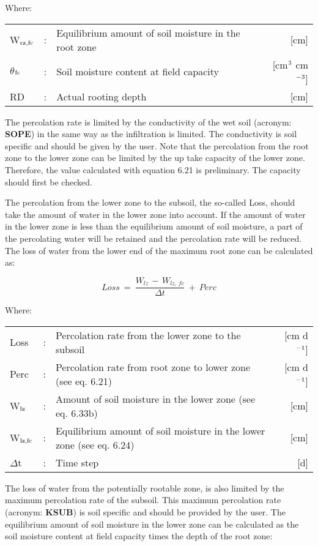 Where:\\[5pt]
\begin{tabularx}{\textwidth}{llXr}
W$_{{\rm rz,fc}}$ &:& Equilibrium amount of soil moisture in the root zone  & [cm]\\
$\theta$$_{{\rm fc}}$ &:& Soil moisture content at field capacity  & [cm$^{{\rm 3}}$ cm$^{{\rm -3}}$]\\
RD &:& Actual rooting depth  & [cm]\\
\end{tabularx}



The percolation rate is limited by the conduc\-tivity of the wet soil (acronym: {\bf SOPE}) in the
same way as the infiltration is limited. The conductivity is soil specific and should be
given by the user. Note that the percolation from the root zone to the lower zone can be
limited by the up take capacity of the lower zone. Therefore, the value calculated with 
equation 6.21 is preliminary. The capacity should first be checked.

The percolation from the lower zone to the subsoil, the so-called Loss, should take the
amount of water in the lower zone into account. If the amount of water in the lower zone
is less than the equilibrium amount of soil moisture, a part of the percolating water will
be retained and the percolation rate will be reduced. The loss of water from the lower end
of the maximum root zone can be calculated as:

\begin{equation}
Loss ~=~{\frac{W _{lz} \, -\, W _{lz,\, fc} }{\Delta t}} ~+~ Perc
\end{equation}

Where:\\[5pt]
\begin{tabularx}{\textwidth}{llXr}
Loss &:& Percolation rate from the lower zone to the subsoil   & [cm d$^{{\rm -1}}$]\\
Perc &:& Percolation rate from root zone to lower zone (see eq. 6.21)  & [cm d$^{{\rm -1}}$]\\
W$_{{\rm lz}}$ &:& Amount of soil moisture in the lower zone (see eq. 6.33b)  & [cm]\\
W$_{{\rm lz,fc}}$ &:& Equilibrium amount of soil moisture in the
   lower zone (see eq. 6.24)  & [cm]\\
$\Delta$t &:& Time step   & [d]\\
\end{tabularx}

The loss of water from the potentially rootable zone, is also limited by the maximum
percolation rate of the subsoil. This maximum percolation rate (acronym: {\bf KSUB}) is soil
specific and should be provided by the user. The equilibrium amount of soil moisture in
the lower zone can be calculated as the soil moisture content at field capacity times the
depth of the root zone:

